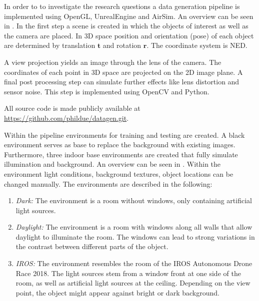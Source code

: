 In order to to investigate the research questions a data generation pipeline is implemented using OpenGL, UnrealEngine and AirSim. An overview can be seen in . In the first step a scene is created in which the objects of interest as well as the camera are placed. In 3D space position and orientation (pose) of each object are determined by translation $\textbf{t}$ and rotation $\textbf{r}$. The coordinate system is \ac{NED}.

A view projection yields an image through the lens of the camera. The coordinates of each point in 3D space are projected on the 2D image plane. A final post processing step can simulate further effects like lens distortion and sensor noise. This step is implemented using OpenCV and Python.

All source code is made publicly available at \url{https://github.com/phildue/datagen.git}.

Within the pipeline environments for training and testing are created. A black environment serves as base to replace the background with existing images. Furthermore, three indoor base environments are created that fully simulate illumination and background. An overview can be seen in . Within the environment light conditions, background textures, object locations can be changed manually. The environments are described in the following:

\begin{enumerate}
	\item \textit{Dark:} The environment is a room without windows, only containing artificial light sources. 
	\item \textit{Daylight:} The environment is a room with windows along all walls that allow daylight to illuminate the room. The windows can lead to strong variations in the contrast between different parts of the object.
	\item \textit{IROS:} The environment resembles the room of the \ac{IROS} Autonomous Drone Race 2018. The light sources stem from a window front at one side of the room, as well as artificial light sources at the ceiling. Depending on the view point, the object might appear against bright or dark background.
\end{enumerate}

